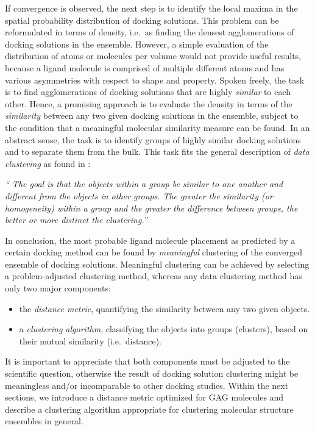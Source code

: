 If convergence is observed, the next step is to identify the local maxima in the
spatial probability distribution of docking solutions. This problem can be
reformulated in terms of density, i.e.\ as finding the densest agglomerations of
docking solutions in the ensemble. However, a simple evaluation of the
distribution of atoms or molecules per volume would not provide useful results,
because a ligand molecule is comprised of multiple different atoms and has
various asymmetries with respect to shape and property. Spoken freely, the task
is to find agglomerations of docking solutions that are highly \textit{similar}
to each other. Hence, a promising approach is to evaluate the density in terms
of the \textit{similarity} between any two given docking solutions in the
ensemble, subject to the condition that a meaningful molecular similarity
measure can be found. In an abstract sense, the task is to identify groups of
highly similar docking solutions and to separate them from the bulk. This task
fits the general description of \textit{data clustering} as found in
\cite{tan_data_mining}:

\begin{adjustwidth}{1.5cm}{1.5cm}
\textit{\enquote{
The goal is that the objects within a group be similar to one another and
different from the objects in other groups. The greater the similarity (or
homogeneity) within a group and the greater the difference between groups, the
better or more distinct the clustering.}}
\end{adjustwidth}

In conclusion, the most probable ligand molecule placement as predicted by a
certain docking method can be found by \textit{meaningful} clustering of the
converged ensemble of docking solutions. Meaningful clustering can be achieved
by selecting a problem-adjusted clustering method, whereas any data clustering
method has only two major components:

\begin{itemize}
\item the \textit{distance metric}, quantifying the similarity between any two
given objects.
\item a \textit{clustering algorithm}, classifying the objects into groups
(clusters), based on their mutual similarity (i.e.\ distance).
\end{itemize}

It is important to appreciate that both components must be adjusted to the
scientific question, otherwise the result of docking solution clustering might
be meaningless and/or incomparable to other docking studies. Within the next
sections, we introduce a distance metric optimized for GAG molecules and
describe a clustering algorithm appropriate for clustering molecular structure
ensembles in general.


